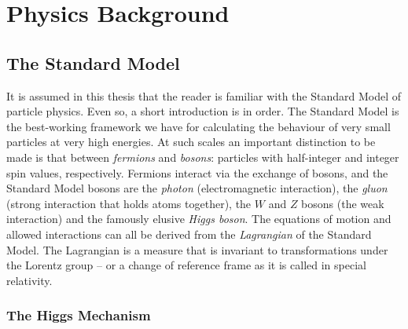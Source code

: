 \documentclass[twoside,english]{uiofysmaster}
\begin{document}
\tableofcontents


\chapter{Physics Background}

\section{The Standard Model}

It is assumed in this thesis that the reader is familiar with the Standard Model of particle physics. Even so, a short introduction is in order. The Standard Model is the best-working framework we have for calculating the behaviour of very small particles at very high energies. At such scales an important distinction to be made is that between \textit{fermions} and \textit{bosons}: particles with half-integer and integer spin values, respectively. Fermions interact via the exchange of bosons, and the Standard Model bosons are the \textit{photon} (electromagnetic interaction), the \textit{gluon} (strong interaction that holds atoms together), the $W$ and $Z$ bosons (the weak interaction) and the famously elusive \textit{Higgs boson}. The equations of motion and allowed interactions can all be derived from the \textit{Lagrangian} of the Standard Model. The Lagrangian is a measure that is invariant to transformations under the Lorentz group -- or a change of reference frame as it is called in special relativity. 


\subsection{The Higgs Mechanism}
\end{document}
